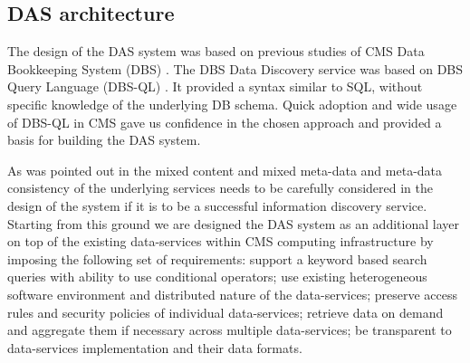 \documentclass[1p,times]{elsarticle}
\begin{document}
\subsection{DAS architecture}
The design of the DAS system was based on previous studies of CMS Data 
Bookkeeping System (DBS) \cite{DBS, DBS07}. The DBS Data Discovery service
\cite{DD} was based on DBS Query Language (DBS-QL) \cite{DBS-QL}. It provided
a syntax similar to SQL, without specific knowledge of the underlying DB schema.
Quick adoption and wide usage of DBS-QL in CMS gave us confidence in the chosen approach 
and provided a basis for building the DAS system.

As was pointed out in \cite{Arms} the mixed content and 
mixed meta-data and meta-data consistency 
of the underlying services needs to be carefully
considered in the design of the system if it is to be a successful information 
discovery service.
Starting from this ground we are designed the DAS system as an
additional layer on top of the existing data-services
within CMS computing infrastructure by imposing the following set of requirements:
support a keyword based search queries with ability to use conditional operators;
use existing heterogeneous software environment and distributed nature of the data-services;
preserve access rules and security policies of individual data-services;
retrieve data on demand and aggregate them if necessary across
multiple data-services;
be transparent to data-services implementation and their data formats.
\end{document}
